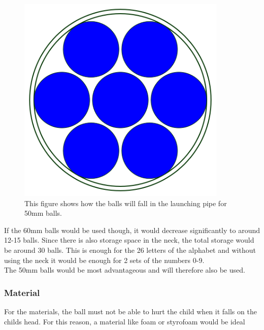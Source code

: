 \documentclass[11pt,twoside,a4paper]{report}
\begin{document}
\begin{figure}[H]
\begin{center}
\includegraphics[width = 10cm]{Images/BallLaunch.png}
\caption{This figure shows how the balls will fall in the launching pipe for 50mm balls.}
\label{fig:balllaunch}
\end{center}
\end{figure}
If the 60mm balls would be used though, it would decrease significantly to around 12-15 balls. 
Since there is also storage space in the neck, the total storage would be around 30 balls. This is enough for the 26 letters of the alphabet and without using the neck it would be enough for 2 sets of the numbers 0-9. \\
The 50mm balls would be most advantageous and will therefore also be used. 

\subsubsection{Material}
For the materials, the ball must not be able to hurt the child when it falls on the childs head. For this reason, a material like foam or styrofoam would be ideal 
\newpage
\end{document}
